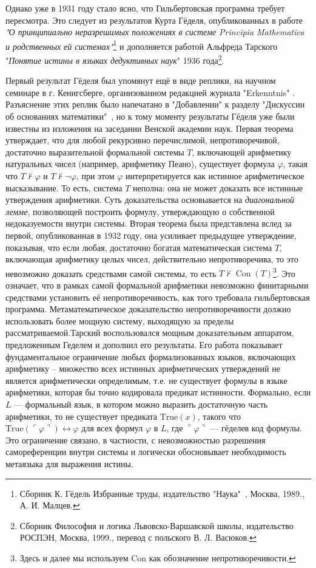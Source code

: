 \documentclass[14pt]{extarticle}
\begin{document}
	Однако уже в 1931 году стало ясно, что Гильбертовская программа требует пересмотра. Это следует из результатов Курта Гёделя, опубликованных в работе \textit{"О принципиально неразрешимых положениях в системе Principia Mathematica и родственных ей системах"}\footnote{Сборник К. Гёдель Избранные труды, издательство "Наука"\  , Москва, 1989., А. И. Малцев.} и дополняется работой Альфреда Тарского "\textit{Понятие истины в языках дедуктивных наук}"  1936 года\footnote{Сборник Философия и логика Львовско-Варшавской школы, издательство РОСПЭН, Москва, 1999., перевод с польского В. Л. Васюков.}.
	
	
	\vspace{0.5em}
	Первый результат Гёделя был упомянут ещё в виде реплики, на научном семинаре в г. Кенигсберге, организованном редакцией журнала "Erkenntnis" \cite{pushkarsky2009}. Разъяснение этих реплик было напечатано в "Добавлении" к разделу "Дискуссии об основаниях математики"\ , но к тому моменту результаты Гёделя уже были известны из изложения на заседании Венской академии наук. 
	Первая теорема утверждает, что для любой рекурсивно перечислимой, непротиворечивой, достаточно выразительной формальной системы $T$, включающей арифметику натуральных чисел (например, арифметику Пеано), существует формула $\varphi$, такая что $T \nvdash \varphi$ и $T \nvdash \neg\varphi$, при этом $\varphi$ интерпретируется как истинное арифметическое высказывание. То есть, система $T$ неполна: она не может доказать все истинные утверждения арифметики. Суть доказательства основывается на \textit{диагональной лемме}, позволяющей построить формулу, утверждающую о собственной недоказуемости внутри системы. Вторая теорема была представлена вслед за первой, опубликованная в 1932 году, она усиливает предыдущее утверждение, показывая, что если любая, достаточно богатая математическая система $T$, включающая арифметику целых чисел, действительно непротиворечива, то это невозможно доказать средствами самой системы, то есть $T \nvdash \operatorname{Con}(T)$\footnote{Здесь и далее мы используем Con как обозначение непротиворечивости.}. Это означает, что в рамках самой формальной арифметики невозможно финитарными средствами установить её непротиворечивость, как того требовала гильбертовская программа. Метаматематическое доказательство непротиворечивости должно использовать более мощную систему, выходящую за пределы рассматриваемой.Тарский воспользовался мощным доказательным аппаратом, предложенным Геделем и дополнил его результаты. Его работа показывает фундаментальное ограничение любых формализованных языков, включающих арифметику -- множество всех истинных арифметических утверждений не является арифметически определимым, т.е. не существует формулы в языке арифметики, которая бы точно кодировала предикат истинности. Формально, если $L$ — формальный язык, в котором можно выразить достаточную часть арифметики, то не существует предиката $\mathrm{True}(x)$, такого что $\mathrm{True}(\ulcorner \varphi \urcorner) \leftrightarrow \varphi$ для всех формул $\varphi$ в $L$, где $\ulcorner \varphi \urcorner$ — гёделев код формулы. Это ограничение связано, в частности, с невозможностью разрешения самореференции внутри системы и логически обосновывает необходимость метаязыка для выражения истины.
	
\end{document}
